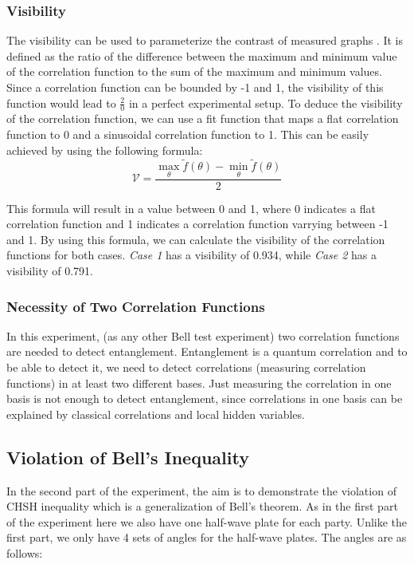 \subsubsection{Visibility}
The visibility can be used to parameterize the contrast of measured graphs \cite{manual}. It is defined as the ratio of the difference between the maximum and minimum value of the correlation function to the sum of the maximum and minimum values.
Since a correlation function can be bounded by -1 and 1, the visibility of this function would lead to $\frac{2}{0}$ in a perfect experimental setup. 
To deduce the visibility of the correlation function, we can use a fit function that maps a flat correlation function to 0 and a sinusoidal correlation function to 1.
This can be easily achieved by using the following formula:
\[\mathcal{V} = \frac{\max_{\theta} \tilde{f}(\theta) - \min_{\theta} \tilde{f}(\theta)}{2}\]

This formula will result in a value between 0 and 1, where 0 indicates a flat correlation function and 1 indicates a correlation function varrying between -1 and 1. By using this formula, we can calculate the visibility of the correlation functions for both cases.
{\itshape Case 1} has a visibility of 0.934, while {\itshape Case 2} has a visibility of 0.791.

\subsubsection{Necessity of Two Correlation Functions}
In this experiment, (as any other Bell test experiment) two correlation functions are needed to detect entanglement. Entanglement is a quantum correlation and to be able to detect it, 
we need to detect correlations (measuring correlation functions) in at least two different bases. Just measuring the correlation in one basis is not enough to detect entanglement, since 
correlations in one basis can be explained by classical correlations and local hidden variables\cite{bell,chsh}.  


\subsection{Violation of Bell’s Inequality}
In the second part of the experiment, the aim is to demonstrate the violation of CHSH inequality which is a generalization of Bell's theorem\cite{chsh}. As in the first part of the experiment
here we also have one half-wave plate for each party. Unlike the first part, we only have 4 sets of angles for the half-wave plates. The angles are as follows:

